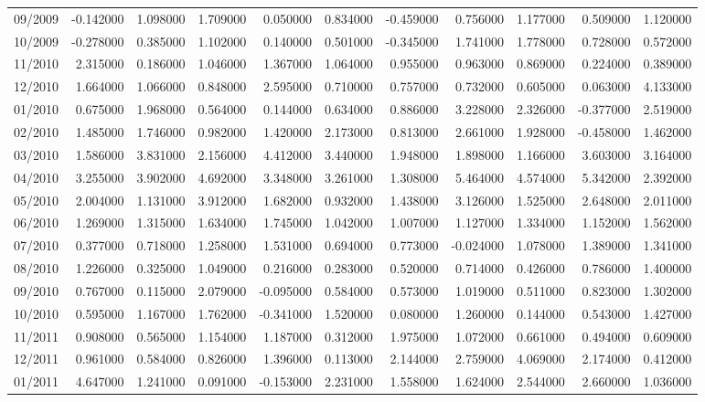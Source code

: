 \begin{tabular}{lrrrrrrrrrr}
09/2009 & -0.142000 & 1.098000 & 1.709000 & 0.050000 & 0.834000 & -0.459000 & 0.756000 & 1.177000 & 0.509000 & 1.120000 \\
10/2009 & -0.278000 & 0.385000 & 1.102000 & 0.140000 & 0.501000 & -0.345000 & 1.741000 & 1.778000 & 0.728000 & 0.572000 \\
11/2010 & 2.315000 & 0.186000 & 1.046000 & 1.367000 & 1.064000 & 0.955000 & 0.963000 & 0.869000 & 0.224000 & 0.389000 \\
12/2010 & 1.664000 & 1.066000 & 0.848000 & 2.595000 & 0.710000 & 0.757000 & 0.732000 & 0.605000 & 0.063000 & 4.133000 \\
01/2010 & 0.675000 & 1.968000 & 0.564000 & 0.144000 & 0.634000 & 0.886000 & 3.228000 & 2.326000 & -0.377000 & 2.519000 \\
02/2010 & 1.485000 & 1.746000 & 0.982000 & 1.420000 & 2.173000 & 0.813000 & 2.661000 & 1.928000 & -0.458000 & 1.462000 \\
03/2010 & 1.586000 & 3.831000 & 2.156000 & 4.412000 & 3.440000 & 1.948000 & 1.898000 & 1.166000 & 3.603000 & 3.164000 \\
04/2010 & 3.255000 & 3.902000 & 4.692000 & 3.348000 & 3.261000 & 1.308000 & 5.464000 & 4.574000 & 5.342000 & 2.392000 \\
05/2010 & 2.004000 & 1.131000 & 3.912000 & 1.682000 & 0.932000 & 1.438000 & 3.126000 & 1.525000 & 2.648000 & 2.011000 \\
06/2010 & 1.269000 & 1.315000 & 1.634000 & 1.745000 & 1.042000 & 1.007000 & 1.127000 & 1.334000 & 1.152000 & 1.562000 \\
07/2010 & 0.377000 & 0.718000 & 1.258000 & 1.531000 & 0.694000 & 0.773000 & -0.024000 & 1.078000 & 1.389000 & 1.341000 \\
08/2010 & 1.226000 & 0.325000 & 1.049000 & 0.216000 & 0.283000 & 0.520000 & 0.714000 & 0.426000 & 0.786000 & 1.400000 \\
09/2010 & 0.767000 & 0.115000 & 2.079000 & -0.095000 & 0.584000 & 0.573000 & 1.019000 & 0.511000 & 0.823000 & 1.302000 \\
10/2010 & 0.595000 & 1.167000 & 1.762000 & -0.341000 & 1.520000 & 0.080000 & 1.260000 & 0.144000 & 0.543000 & 1.427000 \\
11/2011 & 0.908000 & 0.565000 & 1.154000 & 1.187000 & 0.312000 & 1.975000 & 1.072000 & 0.661000 & 0.494000 & 0.609000 \\
12/2011 & 0.961000 & 0.584000 & 0.826000 & 1.396000 & 0.113000 & 2.144000 & 2.759000 & 4.069000 & 2.174000 & 0.412000 \\
01/2011 & 4.647000 & 1.241000 & 0.091000 & -0.153000 & 2.231000 & 1.558000 & 1.624000 & 2.544000 & 2.660000 & 1.036000 \\

\end{tabular}

